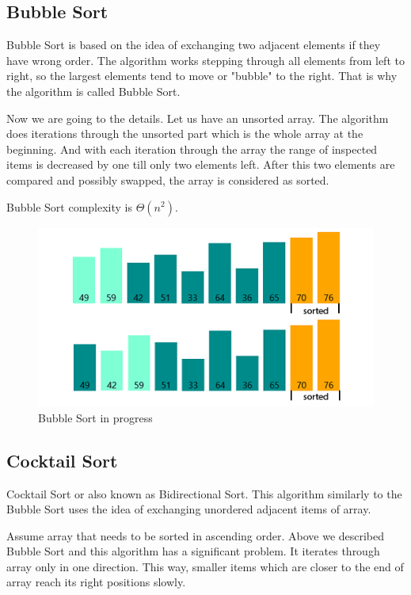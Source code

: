\documentclass[
  field=inf,
  biblatex,
  language=english,
  glossaries,
  theorems=false,
  sourcecodes=false,
  index
]{kidiplom}
\begin{document}
\subsection{Bubble Sort}
\label{sec:bubble}
Bubble Sort is based on the idea of exchanging two adjacent elements if they have wrong order. The algorithm works stepping through all elements from left to right, so the largest elements tend to move or "bubble" to the right. That is why the algorithm is called Bubble Sort.

Now we are going to the details. Let us have an unsorted array. The algorithm does iterations through the unsorted part which is the whole array at the beginning. And with each iteration through the array the range of inspected items is decreased by one till only two elements left. After this two elements are compared and possibly swapped, the array is considered as sorted.

Bubble Sort complexity is $\Theta(n^2)$.

\begin{figure}[H]
\begin{center}
	
	\includegraphics[scale=0.7]{img/Bubblesort.png}
	\caption{Bubble Sort in progress}\label{fig:bubble}
\end{center}
\end{figure}

\subsection{Cocktail Sort}

Cocktail Sort or also known as Bidirectional Sort. This algorithm similarly to the Bubble Sort uses the idea of exchanging unordered adjacent items of array. 

Assume array that needs to be sorted in ascending order. Above we described Bubble Sort and this algorithm has a significant problem. It iterates through array only in one direction. This way, smaller items which are closer to the end of array reach its right positions slowly.
\end{document}
